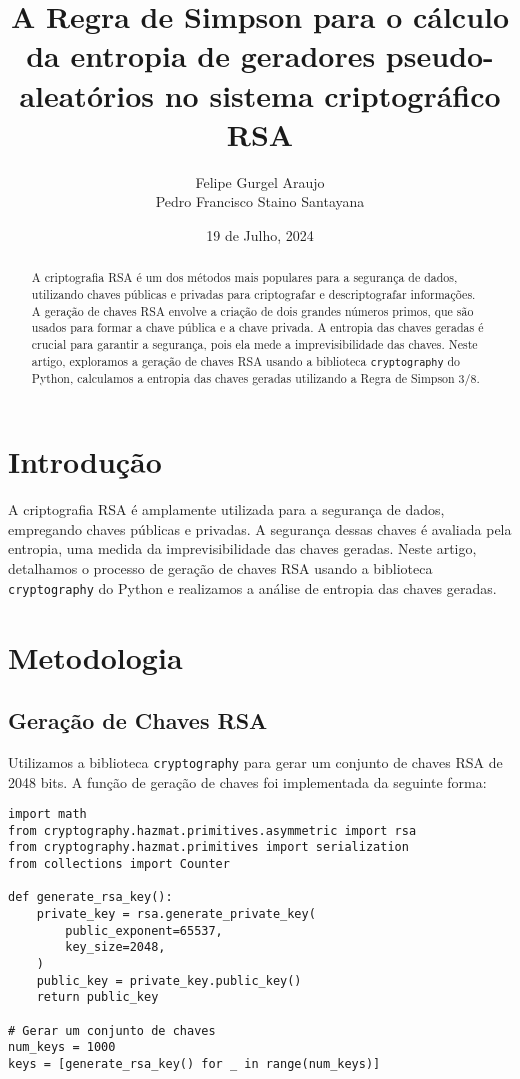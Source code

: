\documentclass{article}
\title{A Regra de Simpson para o cálculo da entropia de geradores pseudo-aleatórios no sistema criptográfico RSA}
\author{
    Felipe Gurgel Araujo\\
    Pedro Francisco Staino Santayana
}
\date{19 de Julho, 2024}
\begin{document}
    \maketitle

    \begin{abstract}
        A criptografia RSA é um dos métodos mais populares para a segurança de dados, utilizando chaves públicas e privadas para criptografar e descriptografar informações. A geração de chaves RSA envolve a criação de dois grandes números primos, que são usados para formar a chave pública e a chave privada. A entropia das chaves geradas é crucial para garantir a segurança, pois ela mede a imprevisibilidade das chaves. Neste artigo, exploramos a geração de chaves RSA usando a biblioteca \texttt{cryptography} do Python, calculamos a entropia das chaves geradas utilizando a Regra de Simpson 3/8.
    \end{abstract}

    \section{Introdução}

    A criptografia RSA é amplamente utilizada para a segurança de dados, empregando chaves públicas e privadas. A segurança dessas chaves é avaliada pela entropia, uma medida da imprevisibilidade das chaves geradas. Neste artigo, detalhamos o processo de geração de chaves RSA usando a biblioteca \texttt{cryptography} do Python e realizamos a análise de entropia das chaves geradas.

    \section{Metodologia}

    \subsection{Geração de Chaves RSA}

    Utilizamos a biblioteca \texttt{cryptography} para gerar um conjunto de chaves RSA de 2048 bits. A função de geração de chaves foi implementada da seguinte forma:

    \begin{verbatim}
import math
from cryptography.hazmat.primitives.asymmetric import rsa
from cryptography.hazmat.primitives import serialization
from collections import Counter

def generate_rsa_key():
    private_key = rsa.generate_private_key(
        public_exponent=65537,
        key_size=2048,
    )
    public_key = private_key.public_key()
    return public_key

# Gerar um conjunto de chaves
num_keys = 1000
keys = [generate_rsa_key() for _ in range(num_keys)]
    \end{verbatim}
\end{document}
